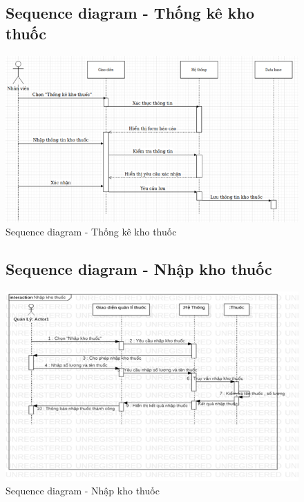 \documentclass{report}
\begin{document}
\begin{center}
	\begin{figure}[!htp]
		\subsection{Sequence diagram - Thống kê kho thuốc}
		\begin{center}
			\includegraphics[scale=1]{Hinh/Sequence diagram Thống kê kho thuốc.png}
		\end{center}
		\caption{Sequence diagram - Thống kê kho thuốc}
	\end{figure}
\end{center}

\pagebreak
\begin{center}
	\begin{figure}[!htp]
		\subsection{Sequence diagram - Nhập kho thuốc}
		\begin{center}
			\includegraphics[scale=1]{Hinh/Sequence diagram Nhập kho thuốc.png}
		\end{center}
		\caption{Sequence diagram - Nhập kho thuốc}
	\end{figure}
\end{center}
\end{document}

